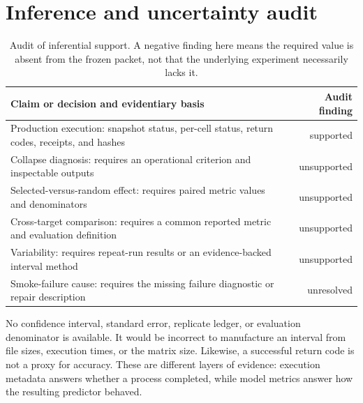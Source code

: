 \documentclass[10pt,twocolumn,letterpaper]{article}
\begin{document}
\section{Inference and uncertainty audit}\label{inference-audit}
\begin{table}[H]\centering\normalsize
\caption{Audit of inferential support. A negative finding here means the required value is absent from the frozen packet, not that the underlying experiment necessarily lacks it.}
\begin{tabularx}{\textwidth}{@{}Xr@{}}
\toprule
Claim or decision and evidentiary basis & Audit finding \\ \midrule
Production execution: snapshot status, per-cell status, return codes, receipts, and hashes & supported \\
Collapse diagnosis: requires an operational criterion and inspectable outputs & unsupported \\
Selected-versus-random effect: requires paired metric values and denominators & unsupported \\
Cross-target comparison: requires a common reported metric and evaluation definition & unsupported \\
Variability: requires repeat-run results or an evidence-backed interval method & unsupported \\
Smoke-failure cause: requires the missing failure diagnostic or repair description & unresolved \\
\bottomrule\end{tabularx}\end{table}
No confidence interval, standard error, replicate ledger, or evaluation denominator is available. It would be incorrect to manufacture an interval from file sizes, execution times, or the matrix size. Likewise, a successful return code is not a proxy for accuracy. These are different layers of evidence: execution metadata answers whether a process completed, while model metrics answer how the resulting predictor behaved.
\end{document}
